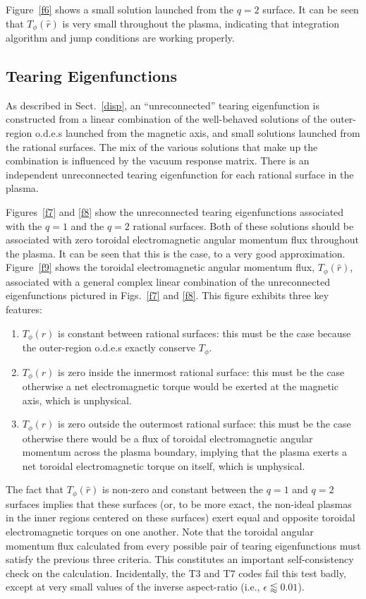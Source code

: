 \documentclass[12pt,prb,aps]{revtex4-1}
\begin{document}
 Figure~\ref{f6} shows a small solution launched from the $q=2$ surface. It can be seen that $T_\phi(\hat{r})$ is very small
 throughout the plasma, indicating that integration algorithm and jump conditions are working properly. 
 
\subsection{Tearing Eigenfunctions}
 As described in Sect.~\ref{disp}, an ``unreconnected'' tearing eigenfunction is constructed from a linear combination of the
 well-behaved solutions of the outer-region o.d.e.s launched from the magnetic axis, and  small solutions launched from the rational surfaces. The mix of the
 various solutions that make up the combination is influenced by the vacuum response matrix. There is an independent unreconnected
 tearing eigenfunction for each rational surface in the plasma. 
 
 Figures~\ref{f7} and \ref{f8} show the unreconnected tearing eigenfunctions associated with the $q=1$ and the $q=2$ rational surfaces. 
 Both of these solutions should be associated with zero toroidal electromagnetic angular momentum flux throughout the plasma. It can be seen that
 this is the case, to a very good approximation. Figure~\ref{f9} shows the toroidal electromagnetic angular momentum flux, $T_\phi(\hat{r})$,  associated with
 a general complex linear combination of the unreconnected eigenfunctions pictured in Figs.~\ref{f7} and \ref{f8}. This figure exhibits three key features:
 \begin{enumerate}
 \item $T_\phi(\hat{r})$ is constant between rational surfaces: this must be the case because the outer-region o.d.e.s exactly conserve $T_\phi$. 
 \item $T_\phi(\hat{r})$ is zero inside the innermost rational surface: this must be the case otherwise a net electromagnetic torque would be
 exerted at the magnetic axis, which is unphysical. 
 \item $T_\phi(\hat{r})$ is zero outside the outermost rational surface: this must be the case otherwise there would be a flux of
 toroidal electromagnetic angular momentum across the plasma boundary, implying that the plasma exerts a net toroidal
 electromagnetic torque on itself, which is unphysical. 
 \end{enumerate}
 The fact that $T_\phi(\hat{r})$ is non-zero and constant between the $q=1$ and $q=2$ surfaces implies that 
 these surfaces (or, to be more exact, the non-ideal plasmas in the inner regions centered on these surfaces) exert equal and
 opposite toroidal electromagnetic torques on one another. 
 Note that the toroidal angular momentum flux calculated from every possible pair of tearing eigenfunctions must satisfy the previous
 three criteria. This constitutes an important self-consistency check on the calculation. Incidentally, the T3 and T7 codes fail this
 test badly, except at very small values of the inverse aspect-ratio (i.e., $\epsilon\lessapprox 0.01$).
 
\end{document}

